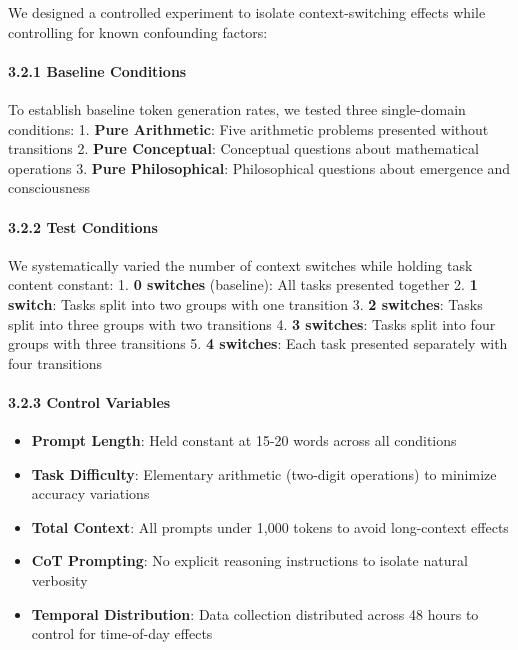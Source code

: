 \documentclass[
  11pt]{article}
\providecommand{\tightlist}{%
  \setlength{\itemsep}{0pt}\setlength{\parskip}{0pt}}
\begin{document}
We designed a controlled experiment to isolate context-switching effects
while controlling for known confounding factors:

\paragraph{3.2.1 Baseline Conditions}\label{baseline-conditions}

To establish baseline token generation rates, we tested three
single-domain conditions: 1. \textbf{Pure Arithmetic}: Five arithmetic
problems presented without transitions 2. \textbf{Pure Conceptual}:
Conceptual questions about mathematical operations 3. \textbf{Pure
Philosophical}: Philosophical questions about emergence and
consciousness

\paragraph{3.2.2 Test Conditions}\label{test-conditions}

We systematically varied the number of context switches while holding
task content constant: 1. \textbf{0 switches} (baseline): All tasks
presented together 2. \textbf{1 switch}: Tasks split into two groups
with one transition 3. \textbf{2 switches}: Tasks split into three
groups with two transitions 4. \textbf{3 switches}: Tasks split into
four groups with three transitions 5. \textbf{4 switches}: Each task
presented separately with four transitions

\paragraph{3.2.3 Control Variables}\label{control-variables}

\begin{itemize}
\tightlist
\item
  \textbf{Prompt Length}: Held constant at 15-20 words across all
  conditions
\item
  \textbf{Task Difficulty}: Elementary arithmetic (two-digit operations)
  to minimize accuracy variations
\item
  \textbf{Total Context}: All prompts under 1,000 tokens to avoid
  long-context effects
\item
  \textbf{CoT Prompting}: No explicit reasoning instructions to isolate
  natural verbosity
\item
  \textbf{Temporal Distribution}: Data collection distributed across 48
  hours to control for time-of-day effects
\end{itemize}
\end{document}
